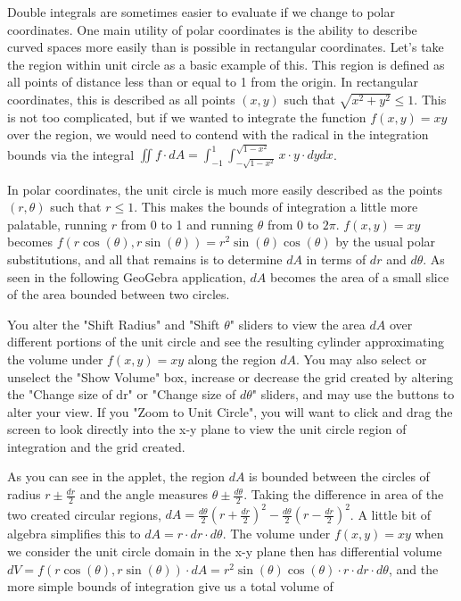 \documentclass{ximera}
\begin{document}
Double integrals are sometimes easier to evaluate if we change to polar coordinates. One main utility of polar coordinates is the ability to describe curved spaces more easily than is possible in rectangular coordinates. Let's take the region within unit circle as a basic example of this. This region is defined as all points of distance less than or equal to 1 from the origin. In rectangular coordinates, this is described as all points $(x,y)$ such that $\sqrt{x^2+y^2}\leq 1$. This is not too complicated, but if we wanted to integrate the function $f(x,y)=xy$ over the region, we would need to contend with the radical in the integration bounds via the integral $\iint f\cdot dA=\int_{-1}^1\int_{-\sqrt{1-x^2}}^{\sqrt{1-x^2}} x\cdot y\cdot  dy dx$.

In polar coordinates, the unit circle is much more easily described as the points $(r,\theta)$ such that $r\leq 1$. This makes the bounds of integration a little more palatable, running $r$ from 0 to 1 and running $\theta$ from 0 to $2 \pi$. $f(x,y)=xy$ becomes $f(r\cos(\theta),r\sin(\theta))=r^2\sin(\theta)\cos(\theta)$ by the usual polar substitutions, and all that remains is to determine $dA$ in terms of $dr$ and $d\theta$. As seen in the following GeoGebra application, $dA$ becomes the area of a small slice of the area bounded between two circles.

You alter the "Shift Radius" and "Shift $\theta$" sliders to view the area $dA$ over different portions of the unit circle and see the resulting cylinder approximating the volume under $f(x,y)=xy$ along the region $dA$. You may also select or unselect the "Show Volume" box, increase or decrease the grid created by altering the "Change size of dr" or "Change size of $d\theta$" sliders, and may use the buttons to alter your view. If you "Zoom to Unit Circle", you will want to click and drag the screen to look directly into the x-y plane to view the unit circle region of integration and the grid created.

\begin{center}
\end{center}

As you can see in the applet, the region $dA$ is bounded between the circles of radius $r\pm \frac{dr}{2}$ and the angle measures $\theta\pm \frac{d\theta}{2}$. Taking the difference in area of the two created circular regions, $dA=\frac{d\theta}{2}(r+\frac{dr}{2})^2-\frac{d\theta}{2}(r-\frac{dr}{2})^2$. A little bit of algebra simplifies this to $dA=r\cdot dr\cdot d\theta$. The volume under $f(x,y)=xy$ when we consider the unit circle domain in the x-y plane then has differential volume $dV=f(r\cos(\theta),r\sin(\theta))\cdot dA=r^2\sin(\theta)\cos(\theta)\cdot r\cdot dr\cdot d\theta$, and the more simple bounds of integration give us a total volume of
\end{document}
